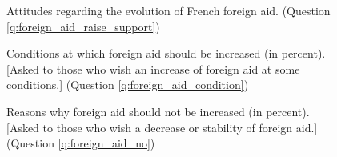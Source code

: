 \documentclass[12pt,english]{article}
\begin{document}
\begin{figure}[h!]
    \caption[Attitudes on the evolution of foreign aid]{Attitudes regarding the evolution of French foreign aid. (Question \ref{q:foreign_aid_raise_support})}\label{fig:foreign_aid_raise_support}
\end{figure}

\begin{figure}[h!]
    \caption[Conditions at which foreign aid should be increased]{Conditions at which foreign aid should be increased (in percent). [Asked to those who wish an increase of foreign aid at some conditions.] (Question \ref{q:foreign_aid_condition})}\label{fig:foreign_aid_condition}
\end{figure}

\begin{figure}[h!]
    \caption[Reasons why foreign aid should not be increased]{Reasons why foreign aid should not be increased (in percent). [Asked to those who wish a decrease or stability of foreign aid.] (Question \ref{q:foreign_aid_no})}\label{fig:foreign_aid_no}
\end{figure}
\end{document}
